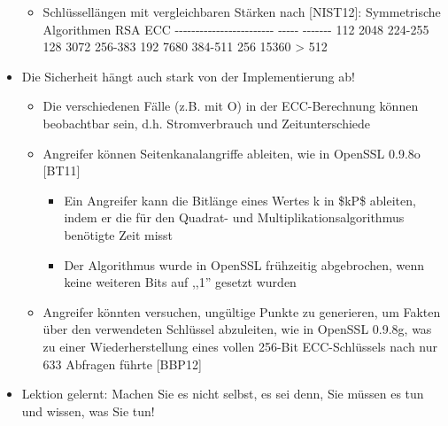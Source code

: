 \documentclass[a4paper]{article}
\begin{document}
\begin{multicols}{3}
\begin{itemize}
              \begin{itemize}
                  \item
                        Schlüssellängen mit vergleichbaren Stärken nach {[}NIST12{]}:
                        \textbar{} Symmetrische Algorithmen \textbar{} RSA \textbar{} ECC
                        \textbar{} \textbar{}
                        -\/-\/-\/-\/-\/-\/-\/-\/-\/-\/-\/-\/-\/-\/-\/-\/-\/-\/-\/-\/-\/-\/-\/-
                        \textbar{} -\/-\/-\/-\/- \textbar{} -\/-\/-\/-\/-\/-\/- \textbar{}
                        \textbar{} 112 \textbar{} 2048 \textbar{} 224-255 \textbar{}
                        \textbar{} 128 \textbar{} 3072 \textbar{} 256-383 \textbar{}
                        \textbar{} 192 \textbar{} 7680 \textbar{} 384-511 \textbar{}
                        \textbar{} 256 \textbar{} 15360 \textbar{} \textgreater{} 512
                        \textbar{}
              \end{itemize}
        \item
              Die Sicherheit hängt auch stark von der Implementierung ab!

              \begin{itemize}
                  \item
                        Die verschiedenen Fälle (z.B. mit O) in der ECC-Berechnung können
                        beobachtbar sein, d.h. Stromverbrauch und Zeitunterschiede
                  \item
                        Angreifer können Seitenkanalangriffe ableiten, wie in OpenSSL 0.9.8o
                        {[}BT11{]}

                        \begin{itemize}
                            \item
                                  Ein Angreifer kann die Bitlänge eines Wertes k in \$kP\$ ableiten,
                                  indem er die für den Quadrat- und Multiplikationsalgorithmus
                                  benötigte Zeit misst
                            \item
                                  Der Algorithmus wurde in OpenSSL frühzeitig abgebrochen, wenn
                                  keine weiteren Bits auf ,,1'' gesetzt wurden
                        \end{itemize}
                  \item
                        Angreifer könnten versuchen, ungültige Punkte zu generieren, um
                        Fakten über den verwendeten Schlüssel abzuleiten, wie in OpenSSL
                        0.9.8g, was zu einer Wiederherstellung eines vollen 256-Bit
                        ECC-Schlüssels nach nur 633 Abfragen führte {[}BBP12{]}
              \end{itemize}
        \item
              Lektion gelernt: Machen Sie es nicht selbst, es sei denn, Sie müssen
              es tun und wissen, was Sie tun!
    \end{itemize}



\end{multicols}
\end{document}
